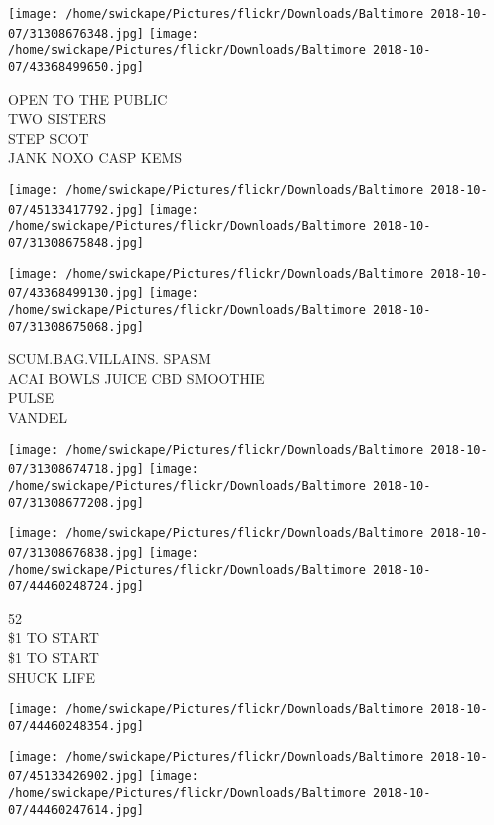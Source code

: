 \documentclass[10pt,letterpaper]{article}
\begin{document}
\texttt{[image: /home/swickape/Pictures/flickr/Downloads/Baltimore 2018-10-07/31308676348.jpg]}
\texttt{[image: /home/swickape/Pictures/flickr/Downloads/Baltimore 2018-10-07/43368499650.jpg]}

OPEN TO THE PUBLIC\\
TWO SISTERS\\
STEP SCOT\\
JANK NOXO CASP KEMS\\
\pagebreak

\texttt{[image: /home/swickape/Pictures/flickr/Downloads/Baltimore 2018-10-07/45133417792.jpg]}
\texttt{[image: /home/swickape/Pictures/flickr/Downloads/Baltimore 2018-10-07/31308675848.jpg]}

\texttt{[image: /home/swickape/Pictures/flickr/Downloads/Baltimore 2018-10-07/43368499130.jpg]}
\texttt{[image: /home/swickape/Pictures/flickr/Downloads/Baltimore 2018-10-07/31308675068.jpg]}

SCUM.BAG.VILLAINS. SPASM\\
ACAI BOWLS JUICE CBD SMOOTHIE\\
PULSE\\
VANDEL\\
\pagebreak

\texttt{[image: /home/swickape/Pictures/flickr/Downloads/Baltimore 2018-10-07/31308674718.jpg]}
\texttt{[image: /home/swickape/Pictures/flickr/Downloads/Baltimore 2018-10-07/31308677208.jpg]}

\texttt{[image: /home/swickape/Pictures/flickr/Downloads/Baltimore 2018-10-07/31308676838.jpg]}
\texttt{[image: /home/swickape/Pictures/flickr/Downloads/Baltimore 2018-10-07/44460248724.jpg]}

52\\
\$1 TO START\\
\$1 TO START\\
SHUCK LIFE\\
\pagebreak

\texttt{[image: /home/swickape/Pictures/flickr/Downloads/Baltimore 2018-10-07/44460248354.jpg]}

\vspace{0.25in}
\texttt{[image: /home/swickape/Pictures/flickr/Downloads/Baltimore 2018-10-07/45133426902.jpg]}
\texttt{[image: /home/swickape/Pictures/flickr/Downloads/Baltimore 2018-10-07/44460247614.jpg]}
\end{document}
